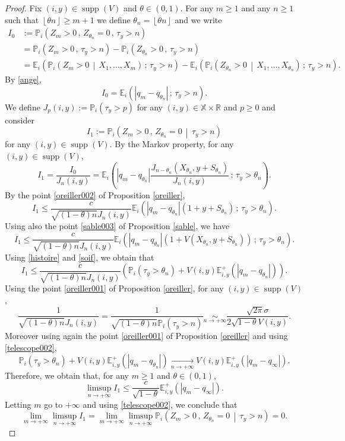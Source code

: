\documentclass[12pt]{amsart}
\theoremstyle{definition}
\numberwithin{equation}{section}
\newcommand*{\abs}[1]{\left\lvert#1\right\rvert}
\newcommand*{\pent}[1]{\left\lfloor#1\right\rfloor}
\newcommand*{\sachant}[2]{\left.#1 \,\middle|\,#2\right.}
\def\bb#1{\mathbb{#1}}
\def\geq{\geqslant}
\def\leq{\leqslant}
\DeclareMathOperator{\supp}{supp}
\begin{document}
\begin{proof}
Fix $(i,y) \in \supp (V)$ and $\theta \in (0,1)$. For any $m \geq 1$ and any $n \geq 1$ such that $\pent{\theta n} \geq m+1$ we define $\theta_n = \pent{\theta n}$ and we write
\begin{align*}
	I_0 &:= \bb P_i \left( Z_m > 0 \,,\, Z_{\theta_n} =0 \,,\, \tau_y > n \right) \\
	&= \bb P_i \left( Z_m > 0 \,,\, \tau_y > n \right) - \bb P_i \left( Z_{\theta_n} > 0 \,,\, \tau_y > n \right) \\
	&= \bb E_i \left( \bb P_i \left( \sachant{Z_m > 0}{X_1, \dots, X_m} \right) \,;\, \tau_y > n \right) - \bb E_i \left( \bb P_i \left( \sachant{Z_{\theta_n} > 0}{X_1, \dots, X_{\theta_n}} \right) \,;\, \tau_y > n \right).
\end{align*}
By \eqref{ange},
\[
I_0 = \bb E_i \left( \abs{q_m - q_{\theta_n}} \,;\, \tau_y > n \right).
\]
We define $J_p(i,y) := \bb P_i \left( \tau_y > p \right)$ for any $(i,y) \in \bb X \times \bb R$ and $p \geq 0$ and consider
\[
I_1  := \bb P_i \left( \sachant{ Z_m > 0 \,,\, Z_{\theta_n} =0 }{ \tau_y > n } \right)
\]
for any $(i,y) \in \supp (V)$. By the Markov property, for any $(i,y) \in \supp (V)$,
\[
I_1 = \frac{I_0}{J_n(i,y)} = \bb E_i \left( \abs{ q_m - q_{\theta_n} } \frac{J_{n-\theta_n}\left( X_{\theta_n}, y+S_{\theta_n} \right)}{J_{n}(i,y)} \,;\, \tau_y > {\theta_n} \right).
\]
By the point \ref{oreiller002} of Proposition \ref{oreiller},
\[
I_1 \leq \frac{c}{\sqrt{(1-\theta)n} J_n(i,y)} \bb E_i \left( \abs{ q_m - q_{\theta_n} } \left( 1+ y+S_{\theta_n} \right) \,;\, \tau_y > {\theta_n} \right).
\]
Using also the point \ref{sable003} of Proposition \ref{sable}, we have
\[
I_1 \leq \frac{c}{\sqrt{(1-\theta)n} J_n(i,y)} \bb E_i \left( \abs{ q_m - q_{\theta_n} } \left( 1+ V\left( X_{\theta_n}, y+S_{\theta_n} \right) \right) \,;\, \tau_y > \theta_n \right).
\]
Using \eqref{histoire} and \eqref{soif}, we obtain that
\[
I_1 \leq \frac{c}{\sqrt{(1-\theta)n} J_n(i,y)} \left( \bb P_i \left( \tau_y > \theta_n \right) + V(i,y) \bb E_{i,y}^+ \left( \abs{ q_m - q_{\theta_n} } \right) \right).
\]
Using the point \ref{oreiller001} of Proposition \ref{oreiller}, for any $(i,y) \in \supp (V)$,
\[
\frac{1}{\sqrt{(1-\theta)n} J_n(i,y)} = \frac{1}{\sqrt{(1-\theta)n} \bb P_i \left( \tau_y > n \right)} \underset{n \to +\infty}{\sim} \frac{\sqrt{2\pi} \sigma}{2\sqrt{1-\theta}V(i,y)}.
\]
Moreover using again the point \ref{oreiller001} of Proposition \ref{oreiller} and using \eqref{telescope002},
\[
\bb P_i \left( \tau_y > \theta_n \right) + V(i,y) \bb E_{i,y}^+ \left( \abs{q_m - q_{\theta_n}} \right) \underset{n \to +\infty}{\longrightarrow} V(i,y) \bb E_{i,y}^+ \left( \abs{q_m - q_{\infty}} \right).
\]
Therefore, we obtain that, for any $m \geq 1$ and $\theta \in (0,1)$,
\[
\limsup_{n\to+\infty} I_1 \leq \frac{c}{\sqrt{1-\theta}} \bb E_{i,y}^+ \left( \abs{q_m - q_{\infty}} \right).
\]
Letting $m$ go to $+\infty$ and using \eqref{telescope002}, we conclude that
\[
\lim_{m\to+\infty} \limsup_{n\to+\infty} I_1 = \lim_{m\to+\infty} \limsup_{n\to+\infty} \bb P_i \left( \sachant{ Z_m > 0 \,,\, Z_{\theta_n} =0 }{ \tau_y > n } \right) =0.
\]
\end{proof}
\end{document}
